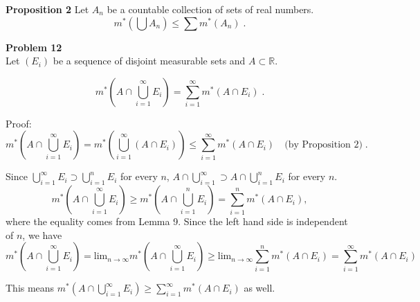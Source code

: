 \documentclass[a4paper]{article}
\begin{document}
{\bf Proposition 2} Let $A_n$ be a countable collection of sets of real numbers.
$$m^*\left(\bigcup A_n\right) \leq \sum m^*(A_n) \;.$$
 
{\bf Problem 12}\\

Let $(E_i)$ be a sequence of disjoint measurable sets and $A \subset \mathbb{R}$.

$$m^*\left(A \cap \bigcup_{i=1}^\infty E_i \right) = \sum_{i=1}^\infty m^*(A \cap E_i) \;.$$

Proof:
$$
m^*\left(A \cap \bigcup_{i=1}^\infty E_i \right) = m^*\left(\bigcup_{i=1}^\infty (A \cap E_i) \right)
\leq \sum_{i = 1}^\infty m^*(A \cap E_i) \quad \text{(by Proposition 2)}\; .
$$

Since $\bigcup_{i=1}^\infty E_i\supset \bigcup_{i=1}^n E_i$ for every $n$, $A\cap \bigcup_{i=1}^\infty \supset A \cap \bigcup_{i=1}^n E_i$ for every $n$.
$$
      m^*\left(A\cap \bigcup_{i=1}^\infty E_i\right)
      \ge m^*\left(A\cap \bigcup_{i=1}^n E_i\right)
      = \sum_{i=1}^n m^*(A\cap E_i),
$$
    where the equality comes from Lemma 9. Since the left hand side is 
    independent of $n$, we have
    $$
      m^*\left(A\cap \bigcup_{i=1}^\infty E_i\right) = \text{lim}_{n\rightarrow \infty} m^*\left(A\cap \bigcup_{i=1}^\infty E_i\right)  \geq \text{lim}_{n\rightarrow \infty}
      \sum_{i=1}^n m^*(A\cap E_i) = \sum_{i=1}^\infty m^*(A\cap E_i)
    $$
    
    This means $m^*\left(A\cap \bigcup_{i=1}^\infty E_i\right) \geq \sum_{i=1}^\infty m^*(A\cap E_i)$ as well.\\
\end{document}
